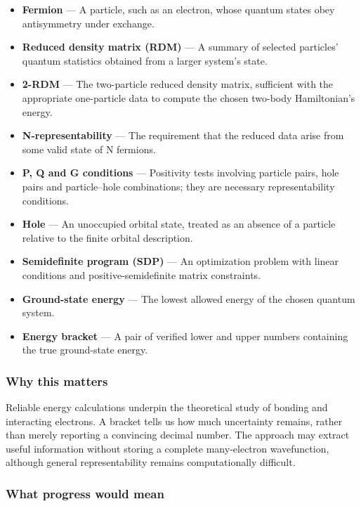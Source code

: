 \documentclass[
  11pt,
]{article}
\begin{document}
\begin{itemize}
\item
  \textbf{Fermion} --- A particle, such as an electron, whose quantum
  states obey antisymmetry under exchange.
\item
  \textbf{Reduced density matrix (RDM)} --- A summary of selected
  particles' quantum statistics obtained from a larger system's state.
\item
  \textbf{2-RDM} --- The two-particle reduced density matrix, sufficient
  with the appropriate one-particle data to compute the chosen two-body
  Hamiltonian's energy.
\item
  \textbf{N-representability} --- The requirement that the reduced data
  arise from some valid state of N fermions.
\item
  \textbf{P, Q and G conditions} --- Positivity tests involving particle
  pairs, hole pairs and particle--hole combinations; they are necessary
  representability conditions.
\item
  \textbf{Hole} --- An unoccupied orbital state, treated as an absence
  of a particle relative to the finite orbital description.
\item
  \textbf{Semidefinite program (SDP)} --- An optimization problem with
  linear conditions and positive-semidefinite matrix constraints.
\item
  \textbf{Ground-state energy} --- The lowest allowed energy of the
  chosen quantum system.
\item
  \textbf{Energy bracket} --- A pair of verified lower and upper numbers
  containing the true ground-state energy.
\end{itemize}

\subsubsection{Why this matters}

Reliable energy calculations underpin the theoretical study of bonding
and interacting electrons. A bracket tells us how much uncertainty
remains, rather than merely reporting a convincing decimal number. The
approach may extract useful information without storing a complete
many-electron wavefunction, although general representability remains
computationally difficult.

\subsubsection{What progress would mean}
\end{document}
